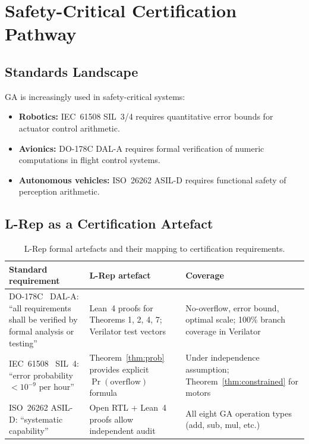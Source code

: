 \documentclass[11pt,a4paper]{article}
\theoremstyle{definition}
\theoremstyle{plain}
\theoremstyle{remark}
\begin{document}
\section{Safety-Critical Certification Pathway}
\label{sec:safety}

\subsection{Standards Landscape}

GA is increasingly used in safety-critical systems:
\begin{itemize}
  \item \textbf{Robotics:} IEC~61508 SIL~3/4 requires quantitative
        error bounds for actuator control arithmetic.
  \item \textbf{Avionics:} DO-178C DAL-A requires formal verification
        of numeric computations in flight control systems.
  \item \textbf{Autonomous vehicles:} ISO~26262 ASIL-D requires
        functional safety of perception arithmetic.
\end{itemize}

\subsection{L-Rep as a Certification Artefact}

\begin{table}[h]
\centering
\caption{L-Rep formal artefacts and their mapping to certification requirements.}
\label{tab:cert}
\begin{tabular}{p{4cm}p{4cm}p{4cm}}
\toprule
Standard requirement & L-Rep artefact & Coverage \\
\midrule
DO-178C~\cite{do178c} DAL-A: ``all requirements shall be verified by formal analysis or testing'' &
Lean~4 proofs for Theorems 1, 2, 4, 7; Verilator test vectors &
No-overflow, error bound, optimal scale; 100\% branch coverage in Verilator \\
IEC~61508~\cite{iec61508} SIL~4: ``error probability $<10^{-9}$ per hour'' &
Theorem~\ref{thm:prob} provides explicit $\Pr(\text{overflow})$ formula &
Under independence assumption; Theorem~\ref{thm:constrained} for motors \\
ISO~26262 ASIL-D: ``systematic capability'' &
Open RTL + Lean~4 proofs allow independent audit &
All eight GA operation types (add, sub, mul, etc.) \\
\bottomrule
\end{tabular}
\end{table}
\end{document}

